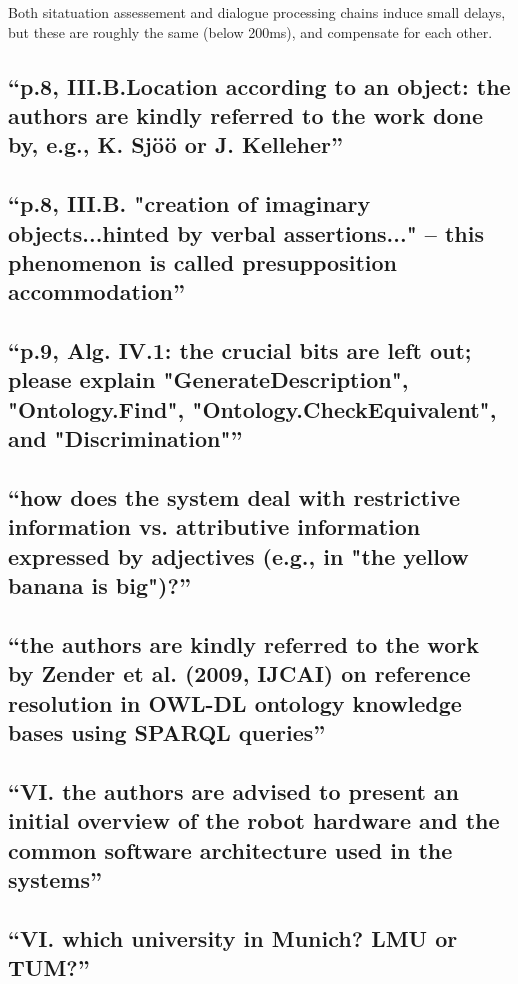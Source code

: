 \documentclass{article}
\begin{document}
Both sitatuation assessement and dialogue processing chains induce 
small delays, but these are roughly the same (below 200ms), and 
compensate for each other.

\subsection{``p.8, III.B.Location according to an object: the authors are
kindly referred to the work done by, e.g., K. Sjöö or J. Kelleher''}

\subsection{``p.8, III.B. "creation of imaginary objects...hinted by verbal
assertions..." -- this phenomenon is called presupposition accommodation''}

\subsection{``p.9, Alg. IV.1: the crucial bits are left out; please explain
"GenerateDescription", "Ontology.Find", "Ontology.CheckEquivalent", and
"Discrimination"''}

\subsection{``how does the system deal with restrictive information vs.
attributive information expressed by adjectives (e.g., in "the yellow banana is
big")?''}

\subsection{``the authors are kindly referred to the work by Zender et al.
(2009, IJCAI) on reference resolution in OWL-DL ontology knowledge bases using
SPARQL queries''}

\subsection{``VI. the authors are advised to present an initial overview of the
robot hardware and the common software architecture used in the systems''}

\subsection{``VI. which university in Munich? LMU or TUM?''}
\end{document}

